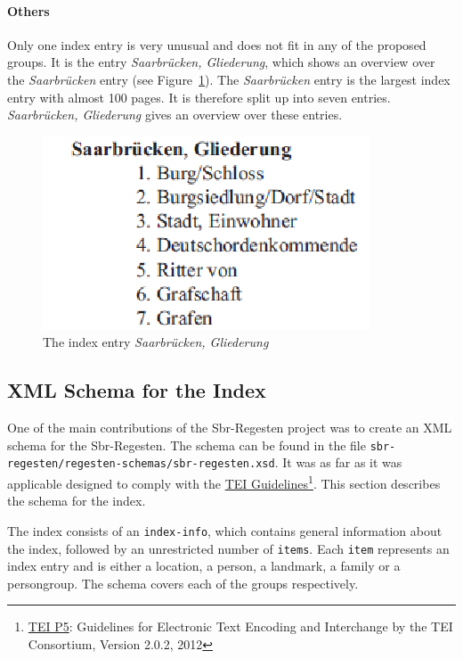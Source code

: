 \paragraph{Others}
\label{sec:other-index-entry}
Only one index entry is very unusual and does not fit in any of the proposed groups. It is the entry \textit{Saarbrücken, Gliederung}, which shows an overview over the \textit{Saarbrücken} entry (see Figure~\ref{fig:sb-gliederung}). The \textit{Saarbrücken} entry is the largest index entry with almost 100 pages. It is therefore split up into seven entries. \textit{Saarbrücken, Gliederung} gives an overview over these entries.

\begin{figure}[h]
  \centering
  \includegraphics[scale=0.6]{img/sb-gliederung}
  \caption{The index entry \textit{Saarbrücken, Gliederung}}
  \label{fig:sb-gliederung}
\end{figure}


\subsection{XML Schema for the Index}
\label{sec:index-schema}
One of the main contributions of the Sbr-Regesten project was to create an XML schema for the Sbr-Regesten. The schema can be found in the file \texttt{sbr-regesten/regesten-schemas/sbr-regesten.xsd}.
It was as far as it was applicable designed to comply with the \href{http://www.tei-c.org/Guidelines/} {TEI Guidelines}\footnote{\href{http://www.tei-c.org/Guidelines/P5/index.xml}{TEI P5}: Guidelines for Electronic Text Encoding and Interchange by the TEI Consortium, Version 2.0.2, 2012}. This section describes the schema for the index.

The index consists of an \texttt{index-info}, which contains general information about the index, followed by an unrestricted number of \texttt{items}. Each \texttt{item} represents an index entry and is either a location, a person, a landmark, a family or a persongroup. The schema covers each of the groups respectively.

